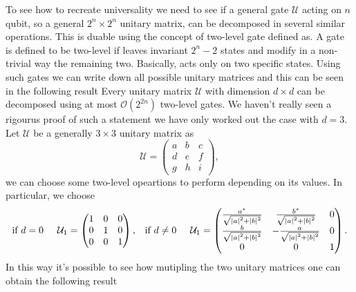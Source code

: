 To see how to recreate universality we need to see if a general gate $\mathcal{U}$ acting on $n$ qubit, so a general $2^n\times 2^n$ unitary matrix, can be decomposed in several similar operations. This is duable using the concept of two-level gate defined as.
{
    A gate is defined to be two-level if leaves invariant $2^n - 2$ states and modify in a non-trivial way the remaining two. Basically, acts only on two specific states.
}
\noindent
Using such gates we can write down all possible unitary matrices and this can be seen in the following result
{
    Every unitary matrix $\mathcal{U}$ with dimension $d\times d$ can be decomposed using at most $\mathcal{O}(2^{2n})$ two-level gates.
}
{
    We haven't really seen a rigourus proof of such a statement we have only worked out the case with $d = 3$. Let $\mathcal{U}$ be a generally $3\times 3$ unitary matrix as
    \begin{equation}
        \mathcal{U} = \begin{pmatrix}
            a & b & c\\
            d & e & f\\
            g & h & i
        \end{pmatrix},
    \end{equation}
    we can choose some two-level opeartions to perform depending on its values. In particular, we choose
    \begin{align}
        &\text{if }d=0 \hspace{0.5cm}\mathcal{U}_1 = \begin{pmatrix}
            1 & 0 & 0\\
            0 & 1 & 0\\
            0 & 0 & 1
        \end{pmatrix}, &\text{if }d\neq 0 \hspace{0.5cm}\mathcal{U}_1 =\begin{pmatrix}
            \frac{a^*}{\sqrt{\abs{a}^2 + \abs{b}^2}} & \frac{b^*}{\sqrt{\abs{a}^2 + \abs{b}^2}} & 0\\
            \frac{b}{\sqrt{\abs{a}^2 + \abs{b}^2}} & -\frac{a}{\sqrt{\abs{a}^2 + \abs{b}^2}} & 0\\
            0 & 0 & 1
        \end{pmatrix}.
    \end{align}
    In this way it's possible to see how mutipling the two unitary matrices one can obtain the following result
    \begin{equation}

\end{equation}}
